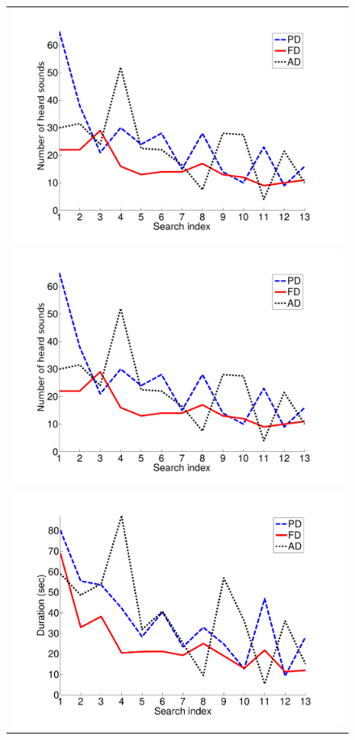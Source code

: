 \documentclass{aes2e}
\begin{document}
\begin{figure}[t!]
\begin{tabular}{c}
\includegraphics[scale=0.29]{gfx/NOHS.pdf} \\
\includegraphics[scale=0.29]{gfx/NOHS.pdf} \\ %
\includegraphics[scale=0.29]{gfx/duration.pdf} 

\end{tabular}
\end{figure}
\end{document}
